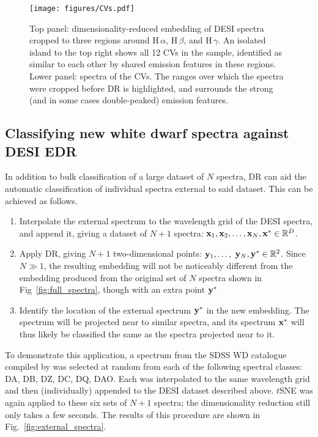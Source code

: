\documentclass[fleqn,usenatbib]{mnras}
\def\xb{\vb{x}}
\def\yb{\vb{y}}
\begin{document}
\begin{figure}
\centering
\texttt{[image: figures/CVs.pdf]}
\caption{
    Top panel: dimensionality-reduced embedding of DESI spectra cropped to three regions around H\,$\alpha$, H\,$\beta$, and H\,$\gamma$.
    An isolated island to the top right shows all 12 CVs in the sample, identified as similar to each other by shared emission features in these regions.
    Lower panel: spectra of the CVs.
    The ranges over which the spectra were cropped before DR is highlighted, and surrounds the strong (and in some cases double-peaked) emission features.
}
\label{fig:CVs}
\end{figure}


\subsection{Classifying new white dwarf spectra against DESI EDR}

In addition to bulk classification of a large dataset of $N$ spectra, DR can aid the automatic classification of individual spectra external to said dataset.
This can be achieved as follows.
\begin{enumerate}
\item
Interpolate the external spectrum to the wavelength grid of the DESI spectra, and append it, giving a dataset of $N+1$ spectra: $\xb_1, \xb_2, \dots, \xb_N, \xb^* \in \mathbb{R}^D$.
\item
Apply DR, giving $N+1$ two-dimensional points: $\yb_1, \dots,$ $\yb_N, \yb^* \in \mathbb{R}^2$.
Since $N\gg1$, the resulting embedding will not be noticeably different from the embedding produced from the original set of $N$ spectra shown in Fig~\ref{fig:full_spectra}, though with an extra point $\yb^*$
\item
Identify the location of the external spectrum $\yb^*$ in the new embedding.
The spectrum will be projected near to similar spectra, and its spectrum $\xb^*$ will thus likely be classified the same as the spectra projected near to it.
\end{enumerate}

To demonstrate this application, a spectrum from the SDSS WD catalogue compiled by \citet{gentilefusillo19} was selected at random from each of the following spectral classes: DA, DB, DZ, DC, DQ, DAO.
Each was interpolated to the same wavelength grid and then (individually) appended to the DESI dataset described above.
$t$SNE was again applied to these six sets of $N+1$ spectra; the dimensionality reduction still only takes a few seconds.
The results of this procedure are shown in Fig.~\ref{fig:external_spectra}.
\end{document}
